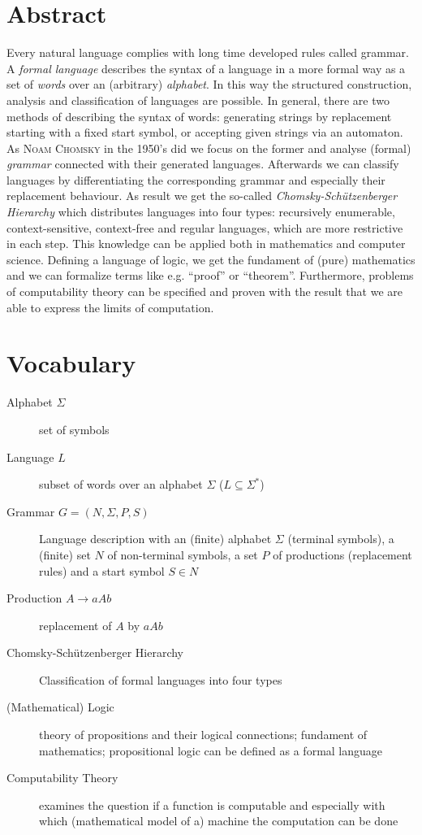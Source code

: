 \documentclass[a4paper, 12pt]{article}
\newcommand{\begriff}[1]{\textit{#1}}
\newcommand{\person}[1]{\textsc{#1}}
\begin{document}
	\section*{Abstract}
	Every natural language complies with long time developed rules called grammar. A \begriff{formal language} describes the syntax of a language in a more formal way as a set of \begriff{words} over an (arbitrary) \begriff{alphabet}. In this way the structured construction, analysis and classification of languages are possible. In general, there are two methods of describing the syntax of words: generating strings by replacement starting with a fixed start symbol, or accepting given strings via an automaton. As \person{Noam Chomsky} in the 1950’s did we focus on the former and analyse (formal) \begriff{grammar} connected with their generated languages. Afterwards we can classify languages by differentiating the corresponding grammar and especially their replacement behaviour. As result we get the so-called \begriff{Chomsky-Schützenberger Hierarchy} which distributes languages into four types: recursively enumerable, context-sensitive, context-free and regular languages, which are more restrictive in each step. This knowledge can be applied both in mathematics and computer science. Defining a language of logic, we get the fundament of (pure) mathematics and we can formalize terms like e.g. \enquote{proof} or \enquote{theorem}. Furthermore, problems of computability theory can be specified and proven with the result that we are able to express the limits of computation.
	
	\section*{Vocabulary}
	\begin{description}
		\item[Alphabet $\Sigma$] set of symbols
		\item[Language $L$] subset of words over an alphabet $\Sigma$ ($L \subseteq \Sigma^\ast$)
		\item[Grammar $G = (N, \Sigma, P, S)$] Language description with an (finite) alphabet $\Sigma$ (terminal symbols), a (finite) set $N$ of non-terminal symbols, a set $P$ of productions (replacement rules) and a start symbol $S \in N$
		\item[Production $A \to aAb$] replacement of $A$ by $aAb$
		\item[Chomsky-Schützenberger Hierarchy] Classification of formal languages into four types
		\item[(Mathematical) Logic] theory of propositions and their logical connections; fundament of mathematics; propositional logic can be defined as a formal language
		\item[Computability Theory] examines the question if a function is computable and especially with which (mathematical model of a) machine the computation can be done 
	\end{description}

	\nocite{*}	
	
	
	
\end{document}
